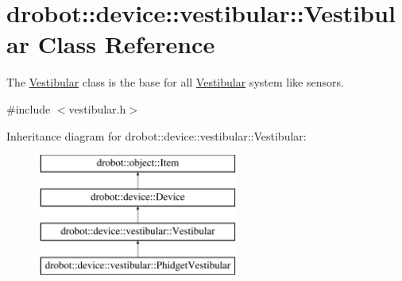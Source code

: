 \hypertarget{classdrobot_1_1device_1_1vestibular_1_1Vestibular}{\section{drobot\-:\-:device\-:\-:vestibular\-:\-:Vestibular Class Reference}
\label{classdrobot_1_1device_1_1vestibular_1_1Vestibular}
}


The \hyperlink{classdrobot_1_1device_1_1vestibular_1_1Vestibular}{Vestibular} class is the base for all \hyperlink{classdrobot_1_1device_1_1vestibular_1_1Vestibular}{Vestibular} system like sensors.  




{\ttfamily \#include $<$vestibular.\-h$>$}

Inheritance diagram for drobot\-:\-:device\-:\-:vestibular\-:\-:Vestibular\-:\begin{figure}[H]
\begin{center}
\leavevmode
\includegraphics[height=4.000000cm]{classdrobot_1_1device_1_1vestibular_1_1Vestibular}
\end{center}
\end{figure}
